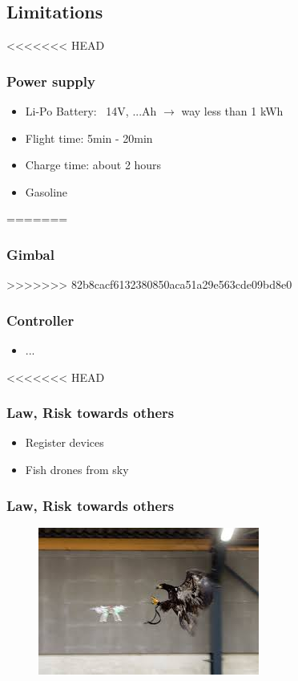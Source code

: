 \subsection{Limitations}

\begin{frame}
<<<<<<< HEAD
\frametitle{Power supply}

  \begin{itemize}
    \item Li-Po Battery: ~14V, ...Ah $\rightarrow$ way less than 1 kWh
    \item Flight time: 5min - 20min
    \item Charge time: about 2 hours
	\item Gasoline
  \end{itemize}
=======
\frametitle{Gimbal}

>>>>>>> 82b8cacf6132380850aca51a29e563cde09bd8e0
  
\end{frame}


\begin{frame}
\frametitle{Controller}

  \begin{itemize}
    \item ...    
  \end{itemize}
    
<<<<<<< HEAD
\end{frame}



\begin{frame}
\frametitle{Law, Risk towards others}

  \begin{itemize}
    \item Register devices    
	\item Fish drones from sky
  \end{itemize}
  	
\end{frame}



\begin{frame}
\frametitle{Law, Risk towards others}
  
  \begin{figure}
  \includegraphics[scale=0.9]{pic/03_our-copter/eagle.jpeg}
  \end{figure}

\end{frame}



